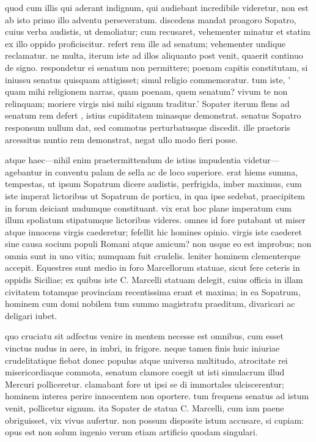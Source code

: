 quod cum illis qui aderant indignum, qui audiebant incredibile videretur, non est ab isto primo illo adventu perseveratum. discedens mandat proagoro Sopatro, cuius verba audistis, ut demoliatur; cum recusaret, vehementer minatur et statim ex illo oppido proficiscitur. refert rem ille ad senatum; vehementer undique reclamatur. ne multa, iterum iste ad illos aliquanto post venit, quaerit continuo de signo. respondetur ei senatum non permittere; poenam capitis constitutam, si iniussu senatus quisquam attigisset; simul religio commemoratur. tum iste, ' quam mihi religionem narras, quam poenam, quem senatum? vivum te non relinquam; moriere virgis nisi mihi signum traditur.' Sopater iterum flens ad senatum rem defert , istius cupiditatem minasque demonstrat. senatus Sopatro responsum nullum dat, sed commotus perturbatusque discedit. ille praetoris arcessitus nuntio rem demonstrat, negat ullo modo fieri posse.

 atque haec—nihil enim praetermittendum de istius impudentia videtur—agebantur in conventu palam de sella ac de loco superiore. erat hiems summa, tempestas, ut ipsum Sopatrum dicere audistis, perfrigida, imber maximus, cum iste imperat lictoribus ut Sopatrum de porticu, in qua ipse sedebat, praecipitem in forum deiciant nudumque constituant. vix erat hoc plane imperatum cum illum spoliatum stipatumque lictoribus videres. omnes id fore putabant ut miser atque innocens virgis caederetur; fefellit hic homines opinio. virgis iste caederet sine causa socium populi Romani atque amicum? non usque eo est improbus; non omnia sunt in uno vitia; numquam fuit crudelis. leniter hominem clementerque accepit. Equestres sunt medio in foro Marcellorum statuae, sicut fere ceteris in oppidis Siciliae; ex quibus iste C. Marcelli statuam delegit, cuius officia in illam civitatem totamque provinciam recentissima erant et maxima; in ea Sopatrum, hominem cum domi nobilem tum summo magistratu praeditum, divaricari ac deligari iubet.

 quo cruciatu sit adfectus venire in mentem necesse est omnibus, cum esset vinctus nudus in aere, in imbri, in frigore. neque tamen finis huic iniuriae crudelitatique fiebat donec populus atque universa multitudo, atrocitate rei misericordiaque commota, senatum clamore coegit ut isti simulacrum illud Mercuri polliceretur. clamabant fore ut ipsi se di immortales ulciscerentur; hominem interea perire innocentem non oportere. tum frequens senatus ad istum venit, pollicetur signum. ita Sopater de statua C. Marcelli, cum iam paene obriguisset, vix vivus aufertur. non possum disposite istum accusare, si cupiam: opus est non solum ingenio verum etiam artificio quodam singulari.

